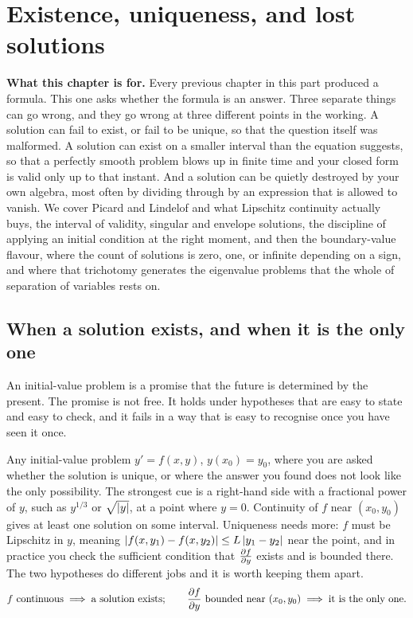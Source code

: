 \chapter{Existence, uniqueness, and lost solutions}

\begin{orient}
\textbf{What this chapter is for.} Every previous chapter in this part produced a formula. This one asks whether the formula is an answer. Three separate things can go wrong, and they go wrong at three different points in the working. A solution can fail to exist, or fail to be unique, so that the question itself was malformed. A solution can exist on a smaller interval than the equation suggests, so that a perfectly smooth problem blows up in finite time and your closed form is valid only up to that instant. And a solution can be quietly destroyed by your own algebra, most often by dividing through by an expression that is allowed to vanish. We cover Picard and Lindelof and what Lipschitz continuity actually buys, the interval of validity, singular and envelope solutions, the discipline of applying an initial condition at the right moment, and then the boundary-value flavour, where the count of solutions is zero, one, or infinite depending on a sign, and where that trichotomy generates the eigenvalue problems that the whole of separation of variables rests on.
\end{orient}

\section{When a solution exists, and when it is the only one}

An initial-value problem is a promise that the future is determined by the present. The promise is not free. It holds under hypotheses that are easy to state and easy to check, and it fails in a way that is easy to recognise once you have seen it once.

\cue Any initial-value problem $y'=f(x,y)$, $y(x_0)=y_0$, where you are asked whether the solution is unique, or where the answer you found does not look like the only possibility. The strongest cue is a right-hand side with a fractional power of $y$, such as $y^{1/3}$ or $\sqrt{\left\lvert y\right\rvert}$, at a point where $y=0$.
\method Continuity of $f$ near $(x_0,y_0)$ gives at least one solution on some interval. Uniqueness needs more: $f$ must be Lipschitz in $y$, meaning $\left\lvert f(x,y_1)-f(x,y_2)\right\rvert\leq L\left\lvert y_1-y_2\right\rvert$ near the point, and in practice you check the sufficient condition that $\frac{\partial f}{\partial y}$ exists and is bounded there. The two hypotheses do different jobs and it is worth keeping them apart.
\[
f \text{ continuous} \implies \text{a solution exists};\qquad
\frac{\partial f}{\partial y}\ \text{bounded near }(x_0,y_0) \implies \text{it is the only one.}
\]

